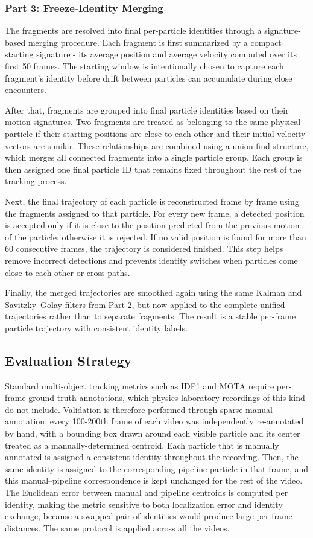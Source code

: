 \documentclass[conference]{IEEEtran}
\begin{document}
\subsubsection{\textbf{Part 3: Freeze-Identity Merging}}
The fragments are resolved into final per-particle identities through a signature-based merging procedure. Each fragment is first summarized by a compact starting signature - its average position and average velocity computed over its first 50 frames. The starting window is intentionally chosen to capture each fragment's identity before drift between particles can accumulate during close encounters.

After that, fragments are grouped into final particle identities based on their motion signatures. Two fragments are treated as belonging to the same physical particle if their starting positions are close to each other and their initial velocity vectors are similar. These relationships are combined using a union-find structure, which merges all connected fragments into a single particle group. Each group is then assigned one final particle ID that remains fixed throughout the rest of the tracking process.

Next, the final trajectory of each particle is reconstructed frame by frame using the fragments assigned to that particle. For every new frame, a detected position is accepted only if it is close to the position predicted from the previous motion of the particle; otherwise it is rejected. If no valid position is found for more than 60 consecutive frames, the trajectory is considered finished. This step helps remove incorrect detections and prevents identity switches when particles come close to each other or cross paths.

Finally, the merged trajectories are smoothed again using the same Kalman and Savitzky–Golay filters from Part 2, but now applied to the complete unified trajectories rather than to separate fragments. The result is a stable per-frame particle trajectory with consistent identity labels.

\subsection{Evaluation Strategy}

Standard multi-object tracking metrics such as IDF1 and MOTA require per-frame ground-truth annotations, which physics-laboratory recordings of this kind do not include. Validation is therefore performed through sparse manual annotation: every 100-200th frame of each video was independently re-annotated by hand, with a bounding box drawn around each visible particle and its center treated as a manually-determined centroid. Each particle that is manually annotated is assigned a consistent identity throughout the recording. Then, the same identity is assigned to the corresponding pipeline particle in that frame, and this manual–pipeline correspondence is kept unchanged for the rest of the video. The Euclidean error between manual and pipeline centroids is computed per identity, making the metric sensitive to both localization error and identity exchange, because a swapped pair of identities would produce large per-frame distances. The same protocol is applied across all the videos.
\end{document}
